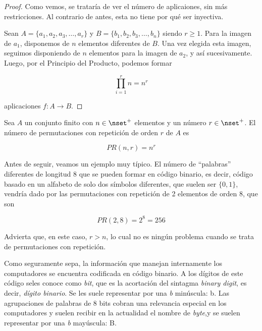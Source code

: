 \begin{proof}
  Como vemos, se trataría de ver el número de aplicaiones, sin más
  restricciones. Al contrario de antes, esta no tiene por qué ser inyectiva.

  Sean $A = \{a_1, a_2, a_3, \ldots, a_r\}$ y $B = \{b_1, b_2, b_3, \ldots,
  b_n\}$ siendo $r \geq 1$. Para la imagen de $a_1$, disponemos de $n$
  elementos diferentes de $B$. Una vez elegida esta imagen, seguimos
  disponiendo de $n$ elementos para la imagen de $a_2$, y así sucesivamente.
  Luego, por el Principio del Producto, podemos formar

  $$ \prod_{i=1}^r n = n^r $$

  \noindent aplicaciones $f: A \longrightarrow B$.
\end{proof}

\begin{corollary}
  Sea $A$ un conjunto finito con $n \in \nset^{+}$ elementos y un número $r
  \in \nset^{+}$. El número de permutaciones con repetición de orden $r$ de
  $A$ es

  $$ PR(n, r) = n^r $$
\end{corollary}

Antes de seguir, veamos un ejemplo muy típico. El número de ``palabras''
diferentes de longitud 8 que se pueden formar en código binario, es decir,
código basado en un alfabeto de solo dos símbolos diferentes, que suelen ser
$\{0, 1\}$, vendría dado por las permutaciones con repetición de 2 elementos
de orden 8, que son

$$ PR(2, 8) = 2^8 = 256 $$

\noindent Advierta que, en este caso, $r > n$, lo cual no es ningún problema
cuando se trata de permutaciones con repetición.

Como seguramente sepa, la información que manejan internamente los
computadores se encuentra codificada en código binario. A los dígitos de
este código seles conoce como \emph{bit}, que es la acortación del sintagma
\emph{binary digit}, es decir, \emph{dígito binario}. Se les suele representar
por una \emph{b} minúscula: b. Las agrupaciones de palabras de 8 bits cobran
una relevancia especial en los computadores y suelen recibir en la
actualidad el nombre de \emph{byte},\footnotemark y se suelen representar
por una \emph{b} mayúscula: B.


